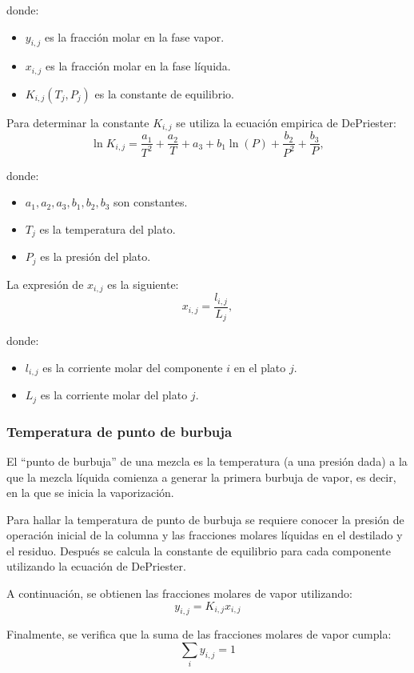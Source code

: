 donde:
\begin{itemize}
    \item $y_{i,j}$ es la fracción molar en la fase vapor.
    \item $x_{i,j}$ es la fracción molar en la fase líquida.
    \item $K_{i,j}(T_j, P_j)$ es la constante de equilibrio.
\end{itemize}

Para determinar la constante $K_{i,j}$ se utiliza la ecuación empirica de DePriester:
$$
    \ln{K_{i,j}} = \frac{a_1}{T^2} + \frac{a_2}{T} + a_3 + b_1 \ln(P) + \frac{b_2}{P^2} + \frac{b_3}{P},
$$

donde:
\begin{itemize}
    \item $a_1, a_2, a_3, b_1, b_2, b_3$ son constantes.
    \item $T_j$ es la temperatura del plato.
    \item $P_j$ es la presión del plato.
\end{itemize}

La expresión de $x_{i,j}$ es la siguiente:
$$
    x_{i,j} = \frac{l_{i,j}}{L_{j}},
$$

donde:
\begin{itemize}
    \item $l_{i,j}$ es la corriente molar del componente $i$ en el plato $j$.
    \item $L_j$ es la corriente molar del plato $j$.
\end{itemize}

\newpage
\subsubsection{Temperatura de punto de burbuja}\label{ss_sec:temperatura_punto_burbuja}
El ``punto de burbuja'' de una mezcla es la temperatura (a una presión dada) a la que la mezcla líquida comienza a generar la primera burbuja de vapor, es decir, en la que se inicia la vaporización.

Para hallar la temperatura de punto de burbuja se requiere conocer la presión de operación inicial de la columna y las fracciones molares líquidas en el destilado y el residuo. Después se calcula la constante de equilibrio para cada componente utilizando la ecuación de DePriester.

A continuación, se obtienen las fracciones molares de vapor utilizando:
$$
    y_{i,j} = K_{i,j} x_{i,j}
$$

Finalmente, se verifica que la suma de las fracciones molares de vapor cumpla:
$$
    \sum_i y_{i,j} = 1
$$


